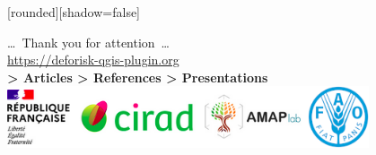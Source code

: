 \documentclass[10pt,table,dvipsnames,compress]{beamer}
\begin{document}
{
  [rounded][shadow=false]
  \begin{frame}[plain]
    \begin{block}{}
      \begin{center}
        \ldots~Thank you for attention~\ldots \\
        \url{https://deforisk-qgis-plugin.org} \\
        \textbf{> Articles > References > Presentations} \\
        \includegraphics[width=0.8\textwidth]{figs/partners_logos}
      \end{center}
    \end{block}
  \end{frame}
}
\end{document}
